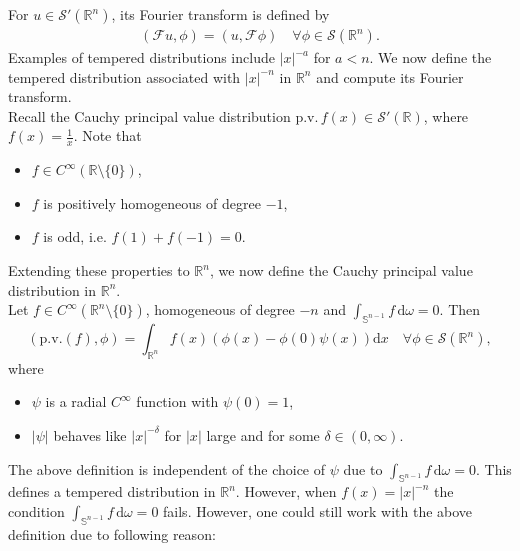 \documentclass[11pt]{article}
\newcommand{\abs}[1]{\lvert #1 \rvert}
\newcommand{\sn}{\mathbb{S}^{n-1}}
\newcommand*\Rn{\mathbb{R}^n}
\newcommand{\sch}{\mathcal{S}}
\renewcommand{\d}{\mathrm{d}}
\begin{document}
For $u \in \mathcal{S}'(\mathbb{R}^n)$, its Fourier transform is defined by
\begin{align}
    (\mathcal{F}u, \phi) = (u, \mathcal{F}\phi) \quad \forall \phi \in \mathcal{S}(\mathbb{R}^n).
\end{align}
Examples of tempered distributions include $|x|^{-a}$ for $a < n$.  
We now define the tempered distribution associated with $|x|^{-n}$ in $\mathbb{R}^n$ 
and compute its Fourier transform.
\vspace{2mm}\\
\noindent Recall the Cauchy principal value distribution 
$\mathrm{p.v.}\,f(x) \in \mathcal{S}'(\mathbb{R})$, where $f(x) = \frac{1}{x}$. 
Note that 
\begin{itemize}
    \item $f \in C^{\infty}(\mathbb{R} \setminus \{0\})$,
    \item $f$ is positively homogeneous of degree $-1$,
    \item $f$ is odd, i.e. $f(1) + f(-1) = 0$.
\end{itemize}
Extending these properties to $\mathbb{R}^n$, we now define the 
Cauchy principal value distribution in $\mathbb{R}^n$. 
\vspace{2mm}\\
Let $f\in C^{\infty}(\Rn\setminus\{0\})$, homogeneous of degree $-n$ and $\int_{\sn} f\, \d \omega=0$. Then
\begin{equation}\label{def_pv}
(\mathrm{p.v.}(f),\phi) = \int_{\Rn} f(x)( \phi(x)- \phi(0) \psi(x)) \d x \quad \forall \phi\in \sch(\mathbb{R}^n),
\end{equation}
where
\begin{itemize}\label{def_of_psi}
    \item $\psi$ is a radial  $C^{\infty}$ function with $\psi(0)=1$,
    \item $\abs{\psi}$ behaves like $\abs{x}^{-\delta}$ for $\abs{x}$ large and for some  $\delta\in (0, \infty)$.
\end{itemize} 
The above definition is independent of 
 the choice of $\psi$ due to $\int_{\sn} f\, \d \omega=0$. This defines a tempered distribution in $\Rn$. However, when  $f(x) = \abs{x}^{-n}$ the  condition $\int_{\sn} f\, \d \omega=0$ fails. However, one could still work with the above definition due to following reason:
\end{document}
